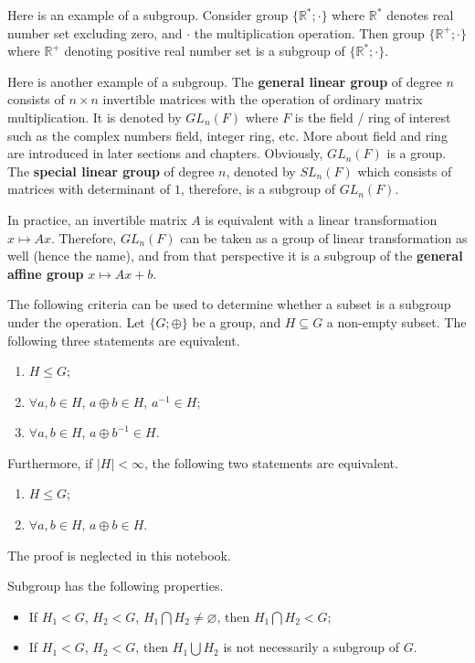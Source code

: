 Here is an example of a subgroup. Consider group $\{\mathbb{R}^*; \cdot\}$ where $\mathbb{R}^*$ denotes real number set excluding zero, and $\cdot$ the multiplication operation. Then group $\{\mathbb{R}^+;\cdot\}$ where $\mathbb{R}^+$ denoting positive real number set is a subgroup of  $\{\mathbb{R}^*; \cdot\}$.

Here is another example of a subgroup. The \textbf{general linear group} of degree $n$ consists of $n \times n$ invertible matrices with the operation of ordinary matrix multiplication. It is denoted by $GL_n(F)$ where $F$ is the field / ring of interest such as the complex numbers field, integer ring, etc. More about field and ring are introduced in later sections and chapters. Obviously, $GL_n(F)$ is a group. The \textbf{special linear group} of degree $n$, denoted by $SL_n(F)$ which consists of matrices with determinant of $1$, therefore, is a subgroup of $GL_n(F)$.

In practice, an invertible matrix $A$ is equivalent with a linear transformation $x \mapsto Ax$. Therefore, $GL_n(F)$ can be taken as a group of linear transformation as well (hence the name), and from that perspective it is a subgroup of the \textbf{general affine group} $x \mapsto Ax + b$.

The following criteria can be used to determine whether a subset is a subgroup under the operation. Let $\{G;\oplus\}$ be a group, and $H\subseteq G$ a non-empty subset. The following three statements are equivalent.
\begin{enumerate}[label=(\roman*)]
  \item $H\leq G$;
  \item $\forall a, b\in H$, $a\oplus b \in H$, $a^{-1}\in H$;
  \item $\forall a, b \in H$, $a\oplus b^{-1} \in H$.
\end{enumerate}
Furthermore, if $|H|<\infty$, the following two statements are equivalent.
\begin{enumerate}[label=(\roman*)]
  \item $H\leq G$;
  \item $\forall a, b\in H$, $a\oplus b \in H$.
\end{enumerate}
The proof is neglected in this notebook.


Subgroup has the following properties.  
\begin{itemize}
  \item If $H_1 < G$, $H_2 < G$, $H_1 \bigcap H_2 \neq \varnothing$, then $H_1 \bigcap H_2 < G$;
  \item If $H_1 < G$, $H_2 < G$, then $H_1 \bigcup H_2$ is not necessarily a subgroup of $G$.
\end{itemize}

